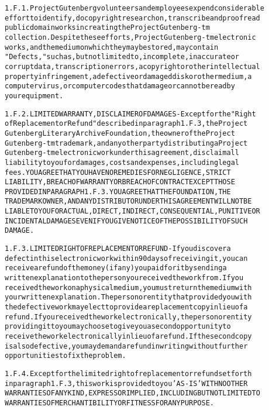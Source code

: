 \documentclass[12pt]{book}[2005/09/16]
\newenvironment{PGtext}{%
\begin{alltt}
\fontsize{8.1}{9}\ttfamily\selectfont}%
{\end{alltt}}
\begin{document}
\begin{PGtext}
1.F.1.  Project Gutenberg volunteers and employees expend considerable
effort to identify, do copyright research on, transcribe and proofread
public domain works in creating the Project Gutenberg-tm
collection.  Despite these efforts, Project Gutenberg-tm electronic
works, and the medium on which they may be stored, may contain
"Defects," such as, but not limited to, incomplete, inaccurate or
corrupt data, transcription errors, a copyright or other intellectual
property infringement, a defective or damaged disk or other medium, a
computer virus, or computer codes that damage or cannot be read by
your equipment.

1.F.2.  LIMITED WARRANTY, DISCLAIMER OF DAMAGES - Except for the "Right
of Replacement or Refund" described in paragraph 1.F.3, the Project
Gutenberg Literary Archive Foundation, the owner of the Project
Gutenberg-tm trademark, and any other party distributing a Project
Gutenberg-tm electronic work under this agreement, disclaim all
liability to you for damages, costs and expenses, including legal
fees.  YOU AGREE THAT YOU HAVE NO REMEDIES FOR NEGLIGENCE, STRICT
LIABILITY, BREACH OF WARRANTY OR BREACH OF CONTRACT EXCEPT THOSE
PROVIDED IN PARAGRAPH 1.F.3.  YOU AGREE THAT THE FOUNDATION, THE
TRADEMARK OWNER, AND ANY DISTRIBUTOR UNDER THIS AGREEMENT WILL NOT BE
LIABLE TO YOU FOR ACTUAL, DIRECT, INDIRECT, CONSEQUENTIAL, PUNITIVE OR
INCIDENTAL DAMAGES EVEN IF YOU GIVE NOTICE OF THE POSSIBILITY OF SUCH
DAMAGE.

1.F.3.  LIMITED RIGHT OF REPLACEMENT OR REFUND - If you discover a
defect in this electronic work within 90 days of receiving it, you can
receive a refund of the money (if any) you paid for it by sending a
written explanation to the person you received the work from.  If you
received the work on a physical medium, you must return the medium with
your written explanation.  The person or entity that provided you with
the defective work may elect to provide a replacement copy in lieu of a
refund.  If you received the work electronically, the person or entity
providing it to you may choose to give you a second opportunity to
receive the work electronically in lieu of a refund.  If the second copy
is also defective, you may demand a refund in writing without further
opportunities to fix the problem.

1.F.4.  Except for the limited right of replacement or refund set forth
in paragraph 1.F.3, this work is provided to you 'AS-IS' WITH NO OTHER
WARRANTIES OF ANY KIND, EXPRESS OR IMPLIED, INCLUDING BUT NOT LIMITED TO
WARRANTIES OF MERCHANTIBILITY OR FITNESS FOR ANY PURPOSE.


\end{PGtext}
\end{document}

